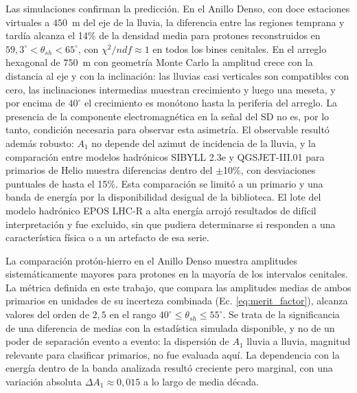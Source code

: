 Las simulaciones confirman la predicción. En el Anillo Denso, con doce estaciones virtuales a $450$~m del eje de la lluvia, la diferencia entre las regiones temprana y tardía alcanza el 14\% de la densidad media para protones reconstruidos en $59,3^\circ < \theta_{sh} < 65^\circ$, con $\chi^2/ndf \approx 1$ en todos los bines cenitales. En el arreglo hexagonal de $750$~m con geometría Monte Carlo la amplitud crece con la distancia al eje y con la inclinación: las lluvias casi verticales son compatibles con cero, las inclinaciones intermedias muestran crecimiento y luego una meseta, y por encima de $40^\circ$ el crecimiento es monótono hasta la periferia del arreglo. La presencia de la componente electromagnética en la señal del SD no es, por lo tanto, condición necesaria para observar esta asimetría. El observable resultó además robusto: $A_1$ no depende del azimut de incidencia de la lluvia, y la comparación entre modelos hadrónicos SIBYLL 2.3e y QGSJET-III.01 para primarios de Helio muestra diferencias dentro del $\pm$10\%, con desviaciones puntuales de hasta el 15\%. Esta comparación se limitó a un primario y una banda de energía por la disponibilidad desigual de la biblioteca. El lote del modelo hadrónico EPOS LHC-R a alta energía arrojó resultados de difícil interpretación y fue excluido, sin que pudiera determinarse si responden a una característica física o a un artefacto de esa serie.

La comparación protón-hierro en el Anillo Denso muestra amplitudes sistemáticamente mayores para protones en la mayoría de los intervalos cenitales. La métrica definida en este trabajo, que compara las amplitudes medias de ambos primarios en unidades de su incerteza combinada (Ec. \ref{eq:merit_factor}), alcanza valores del orden de $2,5$ en el rango $40^\circ \leq \theta_{sh} \leq 55^\circ$. Se trata de la significancia de una diferencia de medias con la estadística simulada disponible, y no de un poder de separación evento a evento: la dispersión de $A_1$ lluvia a lluvia, magnitud relevante para clasificar primarios, no fue evaluada aquí. La dependencia con la energía dentro de la banda analizada resultó creciente pero marginal, con una variación absoluta $\Delta A_1 \approx 0,015$ a lo largo de media década.

